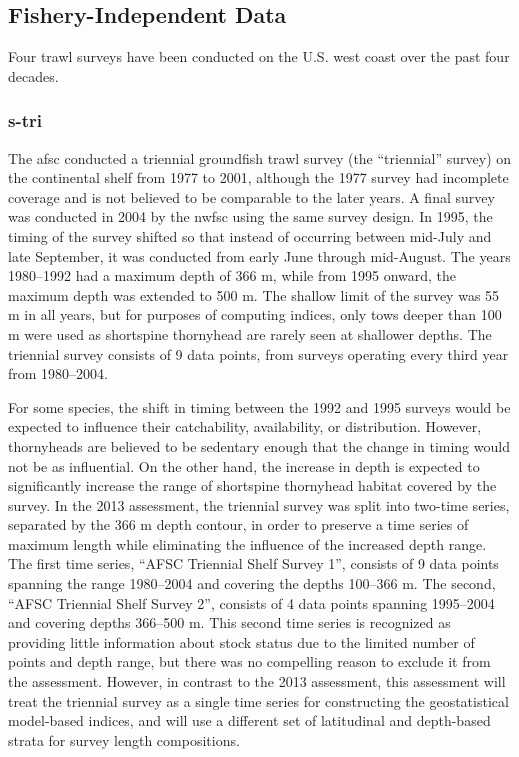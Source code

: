 \documentclass[11pt,
  english,
  letterpaper,
]{article}
\begin{document}
\hypertarget{fishery-independent-data}{%
\subsection{Fishery-Independent Data}\label{fishery-independent-data}}

Four trawl surveys have been conducted on the U.S. west coast over the past four decades.

\hypertarget{section}{%
\subsubsection{\texorpdfstring{\acrlong{s-tri}}{}}\label{section}}

The \gls{afsc} conducted a triennial groundfish trawl survey (the ``triennial'' survey) on the continental shelf from 1977 to 2001, although the 1977 survey had incomplete coverage and is not believed to be comparable to the later years. A final survey was conducted in 2004 by the \gls{nwfsc} using the same survey design. In 1995, the timing of the survey shifted so that instead of occurring between mid-July and late September, it was conducted from early June through mid-August. The years 1980--1992 had a maximum depth of 366 m, while from 1995 onward, the maximum depth was extended to 500 m. The shallow limit of the survey was 55 m in all years, but for purposes of computing indices, only tows deeper than 100 m were used as shortspine thornyhead are rarely seen at shallower depths. The triennial survey consists of 9 data points, from surveys operating every third year from 1980--2004.

For some species, the shift in timing between the 1992 and 1995 surveys would be expected to influence their catchability, availability, or distribution. However, thornyheads are believed to be sedentary enough that the change in timing would not be as influential. On the other hand, the increase in depth is expected to significantly increase the range of shortspine thornyhead habitat covered by the survey. In the 2013 assessment, the triennial survey was split into two-time series, separated by the 366 m depth contour, in order to preserve a time series of maximum length while eliminating the influence of the increased depth range. The first time series, ``AFSC Triennial Shelf Survey 1'', consists of 9 data points spanning the range 1980--2004 and covering the depths 100--366 m. The second, ``AFSC Triennial Shelf Survey 2'', consists of 4 data points spanning 1995--2004 and covering depths 366--500 m. This second time series is recognized as providing little information about stock status due to the limited number of points and depth range, but there was no compelling reason to exclude it from the assessment. However, in contrast to the 2013 assessment, this assessment will treat the triennial survey as a single time series for constructing the geostatistical model-based indices, and will use a different set of latitudinal and depth-based strata for survey length compositions.
\end{document}
